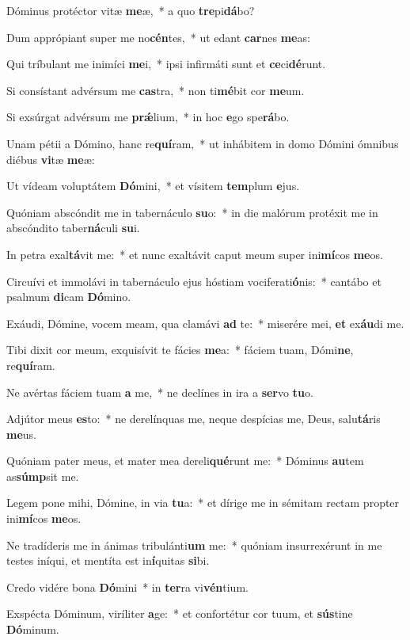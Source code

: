 \item Dóminus protéctor vitæ \textbf{me}æ,~* a quo \textbf{tre}pi\textbf{dá}bo?
\item Dum apprópiant super me no\textbf{cén}tes,~* ut edant \textbf{car}nes \textbf{me}as:
\item Qui tríbulant me inimíci \textbf{me}i,~* ipsi infirmáti sunt et \textbf{ce}ci\textbf{dé}runt.
\item Si consístant advérsum me \textbf{cas}tra,~* non ti\textbf{mé}bit cor \textbf{me}um.
\item Si exsúrgat advérsum me \textbf{prǽ}lium,~* in hoc \textbf{e}go spe\textbf{rá}bo.
\item Unam pétii a Dómino, hanc re\textbf{quí}ram,~* ut inhábitem in domo Dómini ómnibus diébus \textbf{vi}tæ \textbf{me}æ:
\item Ut vídeam voluptátem \textbf{Dó}mini,~* et vísitem \textbf{tem}plum \textbf{e}jus.
\item Quóniam abscóndit me in tabernáculo \textbf{su}o:~* in die malórum protéxit me in abscóndito taber\textbf{ná}culi \textbf{su}i.
\item In petra exal\textbf{tá}vit me:~* et nunc exaltávit caput meum super ini\textbf{mí}cos \textbf{me}os.
\item Circuívi et immolávi in tabernáculo ejus hóstiam vociferati\textbf{ó}nis:~* cantábo et psalmum \textbf{di}cam \textbf{Dó}mino.
\item Exáudi, Dómine, vocem meam, qua clamávi \textbf{ad} te:~* miserére mei, \textbf{et} ex\textbf{áu}di me.
\item Tibi dixit cor meum, exquisívit te fácies \textbf{me}a:~* fáciem tuam, Dómi\textbf{ne}, re\textbf{quí}ram.
\item Ne avértas fáciem tuam \textbf{a} me,~* ne declínes in ira a \textbf{ser}vo \textbf{tu}o.
\item Adjútor meus \textbf{es}to:~* ne derelínquas me, neque despícias me, Deus, salu\textbf{tá}ris \textbf{me}us.
\item Quóniam pater meus, et mater mea dereli\textbf{qué}runt me:~* Dóminus \textbf{au}tem as\textbf{súmp}sit me.
\item Legem pone mihi, Dómine, in via \textbf{tu}a:~* et dírige me in sémitam rectam propter ini\textbf{mí}cos \textbf{me}os.
\item Ne tradíderis me in ánimas tribulánti\textbf{um} me:~* quóniam insurrexérunt in me testes iníqui, et mentíta est in\textbf{í}quitas \textbf{si}bi.
\item Credo vidére bona \textbf{Dó}mini~* in \textbf{ter}ra vi\textbf{vén}tium.
\item Exspécta Dóminum, viríliter \textbf{a}ge:~* et confortétur cor tuum, et \textbf{sús}tine \textbf{Dó}minum.
